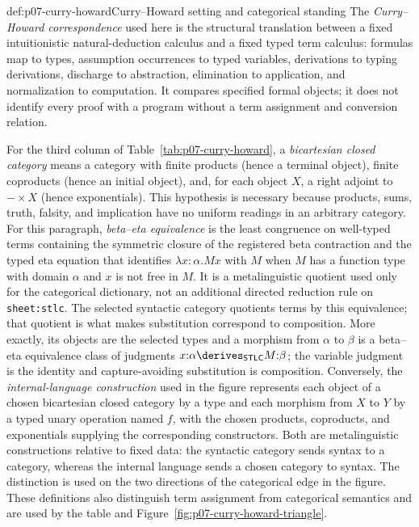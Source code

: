 \begin{hbdefinition}{def:p07-curry-howard}{Curry--Howard setting and categorical standing}
The \emph{Curry--Howard correspondence} used here is the structural
translation between a fixed intuitionistic natural-deduction calculus and a
fixed typed term calculus: formulas map to types, assumption occurrences to
typed variables, derivations to typing derivations, discharge to abstraction,
elimination to application, and normalization to computation.  It compares
specified formal objects; it does not identify every proof with a program
without a term assignment and conversion relation.

For the third column of Table~\ref{tab:p07-curry-howard}, a
\emph{bicartesian closed category} means a category with finite products
(hence a terminal object), finite coproducts (hence an initial object), and,
for each object \(X\), a right adjoint to \(-\times X\) (hence
exponentials).  This hypothesis is necessary because products, sums, truth,
falsity, and implication have no uniform readings in an arbitrary category.
For this paragraph, \emph{beta--eta equivalence} is the least congruence on
well-typed terms containing the symmetric closure of the registered beta
contraction and the typed eta equation that identifies
\(\lambda x{:}\alpha.Mx\) with \(M\) when \(M\) has a function type with
domain \(\alpha\) and \(x\) is not free in \(M\).
It is a metalinguistic quotient used only for the categorical dictionary,
not an additional directed reduction rule on \texttt{sheet:stlc}.  The
selected syntactic category quotients terms by this equivalence; that
quotient is what makes substitution correspond to composition.  More
exactly, its objects are the selected types and a
morphism from \(\alpha\) to \(\beta\) is a beta--eta equivalence class of
judgments
\(x{:}\alpha\derives_{\mathsf{STLC}}M{:}\beta\); the variable judgment is
the identity and capture-avoiding substitution is composition.  Conversely,
the \emph{internal-language construction} used in the figure represents each
object of a chosen bicartesian closed category by a type and each morphism
from \(X\) to \(Y\) by a typed unary operation named \(f\), with the chosen
products, coproducts, and exponentials supplying the corresponding
constructors.  Both
are metalinguistic constructions relative to fixed data: the syntactic
category sends syntax to a category, whereas the internal language sends a
chosen category to syntax.  The distinction is used on the two directions of
the categorical edge in the figure.  These definitions also distinguish
term assignment from categorical semantics and are used by the table and
Figure~\ref{fig:p07-curry-howard-triangle}.
\end{hbdefinition}

